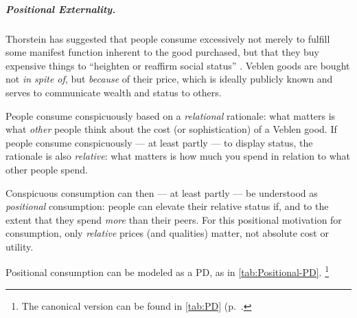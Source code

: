 
\subparagraph{Positional Externality.}  \label{sec:positional-race} Thorstein \cite{Veblen1899} has suggested that people consume excessively not merely to fulfill some manifest function inherent to the good purchased, but that they buy expensive things to ``heighten or reaffirm social status'' \citep[123]{Merton-1968-aa}.
Veblen goods are bought not \emph{in spite of}, but \emph{because} of their price, which is ideally publicly known and serves to communicate wealth and status to others.

People consume conspicuously based on a \emph{relational} rationale:
what matters is what \emph{other} people think about the cost (or sophistication) of a Veblen good.
If people consume conspicuously --- at least partly --- to display status, the rationale is also \emph{relative}:
what matters is how much you spend in relation to what other people spend.

Conspicuous consumption can then --- at least partly --- be understood as \emph{positional} consumption:
people can elevate their relative status if, and to the extent that they spend \emph{more} than their peers.
For this positional motivation for consumption, only \emph{relative} prices (and qualities) matter, not absolute cost or utility.

Positional consumption can be modeled as a \gls{PD}, as in \autoref{tab:Positional-PD}.
\footnote{
	The canonical version can be found in \autoref{tab:PD} (p.~\pageref{tab:PD}.
}

